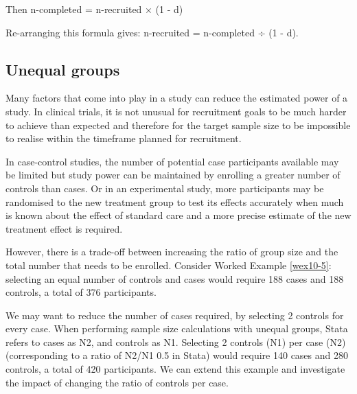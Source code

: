 \documentclass[
]{memoir}
\begin{document}
Then n-completed = n-recruited × (1 - d)

Re-arranging this formula gives: n-recruited = n-completed ÷ (1 - d).

\hypertarget{unequal-groups}{%
\subsection{Unequal groups}\label{unequal-groups}}

Many factors that come into play in a study can reduce the estimated power of a study. In clinical trials, it is not unusual for recruitment goals to be much harder to achieve than expected and therefore for the target sample size to be impossible to realise within the timeframe planned for recruitment.

In case-control studies, the number of potential case participants available may be limited but study power can be maintained by enrolling a greater number of controls than cases. Or in an experimental study, more participants may be randomised to the new treatment group to test its effects accurately when much is known about the effect of standard care and a more precise estimate of the new treatment effect is required.

However, there is a trade-off between increasing the ratio of group size and the total number that needs to be enrolled. Consider Worked Example \ref{wex10-5}: selecting an equal number of controls and cases would require 188 cases and 188 controls, a total of 376 participants.

We may want to reduce the number of cases required, by selecting 2 controls for every case. When performing sample size calculations with unequal groups, Stata refers to cases as N2, and controls as N1. Selecting 2 controls (N1) per case (N2) (corresponding to a ratio of N2/N1 0.5 in Stata) would require 140 cases and 280 controls, a total of 420 participants. We can extend this example and investigate the impact of changing the ratio of controls per case.

 
  \providecommand{\huxb}[2]{\arrayrulecolor[RGB]{#1}\global\arrayrulewidth=#2pt}
  \providecommand{\huxvb}[2]{\color[RGB]{#1}\vrule width #2pt}
  \providecommand{\huxtpad}[1]{\rule{0pt}{#1}}
  \providecommand{\huxbpad}[1]{\rule[-#1]{0pt}{#1}}
\end{document}
